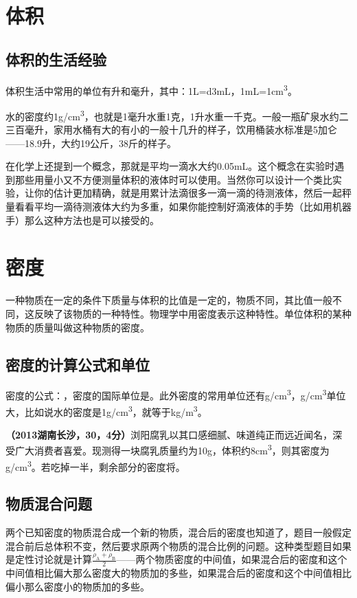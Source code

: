\documentclass[12pt,twoside]{exam}
\begin{document}
\begin{knowledge}
\vspace*{20pt}


\section{体积}
\subsection{体积的生活经验}
体积生活中常用的单位有升和毫升，其中：1L=\num{d3}mL，1mL=1\si{cm^3}。

水的密度约1\si{g/cm^3}，也就是1毫升水重1克，1升水重一千克。一般一瓶矿泉水约二三百毫升，家用水桶有大的有小的一般十几升的样子，饮用桶装水标准是5加仑——18.9升，大约19公斤，38斤的样子。

在化学上还提到一个概念，那就是平均一滴水大约0.05mL。这个概念在实验时遇到那些用量小又不方便测量体积的液体时可以使用。当然你可以设计一个类比实验，让你的估计更加精确，就是用累计法滴很多一滴一滴的待测液体，然后一起秤量看看平均一滴待测液体大约为多重，如果你能控制好滴液体的手势（比如用机器手）那么这种方法也是可以接受的。



\section{密度}
一种物质在一定的条件下质量与体积的比值是一定的，物质不同，其比值一般不同，这反映了该物质的一种特性。物理学中用密度表示这种特性。单位体积的某种物质的质量叫做这种物质的密度。

\subsection{密度的计算公式和单位}
密度的公式：\answerline*[$\rho =m/V$]，密度的国际单位是\answerline*[\si{kg/m^3}]。此外密度的常用单位还有\si{g/cm^3}，\si{g/cm^3}单位大，比如说水的密度是1\si{g/cm^3}，就等于\linebreak \si{kg/m^3}。

\textbf{（2013湖南长沙，30，4分）}浏阳腐乳以其口感细腻、味道纯正而远近闻名，深受广大消费者喜爱。现测得一块腐乳质量约为10g，体积约8\si{cm^3}，则其密度为\answerline*[1.25]\si{g/cm^3}。若吃掉一半，剩余部分的密度将\answerline*[不变]。


\subsection{物质混合问题}
两个已知密度的物质混合成一个新的物质，混合后的密度也知道了，题目一般假定混合前后总体积不变，然后要求原两个物质的混合比例的问题。这种类型题目如果是定性讨论就是计算{\large $\frac{\rho_\textrm{A}+\rho_\textrm{B}}{2}$}——两个物质密度的中间值，如果混合后的密度和这个中间值相比偏大那么密度大的物质加的多些，如果混合后的密度和这个中间值相比偏小那么密度小的物质加的多些。


\end{knowledge}
\end{document}
